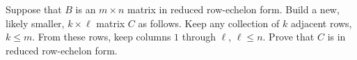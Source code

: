 Suppose that $B$ is an $m\times n$ matrix in reduced row-echelon form.  Build a new, likely smaller, $k\times\ell$ matrix $C$ as follows.  Keep any collection of $k$ adjacent rows, $k\leq m$.  From these rows, keep columns $1$ through $\ell$, $\ell\leq n$.  Prove that $C$ is in reduced row-echelon form. 